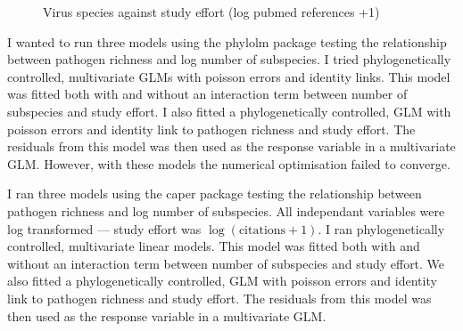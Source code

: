 \begin{knitrout}
\begin{figure}[t]
{}

\caption[Virus species against study effort (log pubmed references +1)]{Virus species against study effort (log pubmed references +1)}\label{fig:subsDataviz}
\end{figure}


\end{knitrout}


I wanted to run three models using the phylolm package testing the relationship between pathogen richness and log number of subspecies.
I tried phylogenetically controlled, multivariate GLMs with poisson errors and identity links.
This model was fitted both with and without an interaction term between number of subspecies and study effort.
I also fitted a phylogenetically controlled, GLM with poisson errors and identity link to pathogen richness and study effort.
The residuals from this model was then used as the response variable in a multivariate GLM.
However, with these models the numerical optimisation failed to converge.

I ran three models using the caper package \cite{caper} testing the relationship between pathogen richness and log number of subspecies.
All independant variables were log transformed --- study effort was $\log(\text{citations} + 1)$.
I ran phylogenetically controlled, multivariate linear models.
This model was fitted both with and without an interaction term between number of subspecies and study effort.
We also fitted a phylogenetically controlled, GLM with poisson errors and identity link to pathogen richness and study effort.
The residuals from this model was then used as the response variable in a multivariate GLM.



